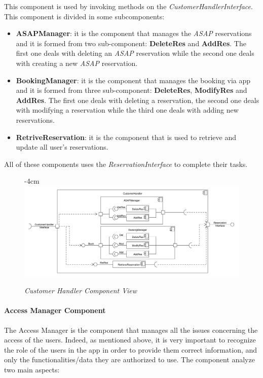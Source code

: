 \documentclass{article}
\begin{document}
					This component is used by invoking methods on the \emph{CustomerHandlerInterface}. This component is divided in some subcomponents:
					
					\begin{itemize}
						\item {\bfseries ASAPManager}: it is the component that manages the \emph{ASAP} reservations and it is formed from two sub-component: {\bfseries DeleteRes} and {\bfseries AddRes}. The first one deals with deleting an \emph{ASAP} reservation while the second one deals with creating a new \emph{ASAP} reservation.
						
						\item {\bfseries BookingManager}: it is the component that manages the booking via app and it is formed from three sub-component: {\bfseries DeleteRes}, {\bfseries ModifyRes} and {\bfseries AddRes}. The first one deals with deleting a reservation, the second one deals with modifying a reservation while the third one deals with adding new reservations. 
						
						\item {\bfseries RetriveReservation}: it is the component that is used to retrieve and update all user’s reservations.
					\end{itemize}
				
					All of these components uses the \emph{ReservationInterface} to complete their tasks.
					\bigskip
					\begin{figure}[h]
						\begin{adjustwidth} {-4cm}{}
							\centering
							\includegraphics[scale=0.45]{Component Diagrams/CustomerHandlerComponentView.pdf}\\
						\end{adjustwidth}
						\caption{\emph{Customer Handler Component View}}
					\end{figure}
				\newpage
				\paragraph{Access Manager Component}
					The Access Manager is the component that manages all the issues concerning the access of the users. Indeed, as mentioned above, it is very important to recognize the role of the users in the app in order to provide them correct information, and only the functionalities/data they are authorized to use. The component analyze two main aspects:
					
\end{document}
